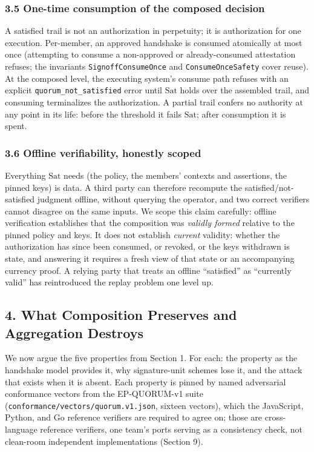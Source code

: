 \documentclass[
  11pt,
]{article}
\begin{document}
\subsubsection{3.5 One-time consumption of the composed
decision}\label{one-time-consumption}

A satisfied trail is not an authorization in perpetuity; it is
authorization for one execution. Per-member, an approved handshake is
consumed atomically at most once (attempting to consume a non-approved
or already-consumed attestation refuses; the invariants
\texttt{SignoffConsumeOnce} and \texttt{ConsumeOnceSafety} cover reuse).
At the composed level, the executing system's consume path refuses with
an explicit \texttt{quorum\_not\_satisfied} error until $\mathrm{Sat}$
holds over the assembled trail, and consuming terminalizes the
authorization. A partial trail confers no authority at any point in its
life: before the threshold it fails $\mathrm{Sat}$; after consumption
it is spent.

\subsubsection{3.6 Offline verifiability, honestly
scoped}\label{offline-verifiability}

Everything $\mathrm{Sat}$ needs (the policy, the members' contexts and
assertions, the pinned keys) is data. A third party can therefore
recompute the satisfied/not-satisfied judgment offline, without querying
the operator, and two correct verifiers cannot disagree on the same
inputs. We scope this claim carefully: offline verification establishes
that the composition was \emph{validly formed} relative to the pinned
policy and keys. It does not establish \emph{current} validity: whether
the authorization has since been consumed, or revoked, or the keys
withdrawn is state, and answering it requires a fresh view of that state
or an accompanying currency proof. A relying party that treats an
offline ``satisfied'' as ``currently valid'' has reintroduced the replay
problem one level up.

\subsection{4. What Composition Preserves and Aggregation
Destroys}\label{what-composition-preserves}

We now argue the five properties from Section 1. For each: the property
as the handshake model provides it, why signature-unit schemes lose it,
and the attack that exists when it is absent. Each property is pinned by
named adversarial conformance vectors from the EP-QUORUM-v1 suite
(\texttt{conformance/vectors/quorum.v1.json}, sixteen vectors), which the
JavaScript, Python, and Go reference verifiers are required to agree on;
those are cross-language reference verifiers, one team's ports serving
as a consistency check, not clean-room independent implementations
(Section 9).
\end{document}
